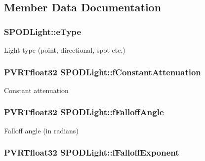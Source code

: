  

\subsection{Member Data Documentation}
\hypertarget{struct_s_p_o_d_light_ae3c2bbe7fb4f991d479a383c646629ba}{
\subsubsection[{e\+Type}]{ S\+P\+O\+D\+Light\+::e\+Type}}\label{struct_s_p_o_d_light_ae3c2bbe7fb4f991d479a383c646629ba}
Light type (point, directional, spot etc.) \hypertarget{struct_s_p_o_d_light_a1aa0452799cfda2c3a358e48c3e9c822}{
\subsubsection[{f\+Constant\+Attenuation}]{\setlength{\rightskip}{0pt plus 5cm}P\+V\+R\+Tfloat32 S\+P\+O\+D\+Light\+::f\+Constant\+Attenuation}}\label{struct_s_p_o_d_light_a1aa0452799cfda2c3a358e48c3e9c822}
Constant attenuation \hypertarget{struct_s_p_o_d_light_ae86b850d6d902b0b40cff229a8a98e9b}{
\subsubsection[{f\+Falloff\+Angle}]{\setlength{\rightskip}{0pt plus 5cm}P\+V\+R\+Tfloat32 S\+P\+O\+D\+Light\+::f\+Falloff\+Angle}}\label{struct_s_p_o_d_light_ae86b850d6d902b0b40cff229a8a98e9b}
Falloff angle (in radians) \hypertarget{struct_s_p_o_d_light_a6f57b5edb1af09a7e6381b1e7ebaffdc}{
\subsubsection[{f\+Falloff\+Exponent}]{\setlength{\rightskip}{0pt plus 5cm}P\+V\+R\+Tfloat32 S\+P\+O\+D\+Light\+::f\+Falloff\+Exponent}}\label{struct_s_p_o_d_light_a6f57b5edb1af09a7e6381b1e7ebaffdc}
